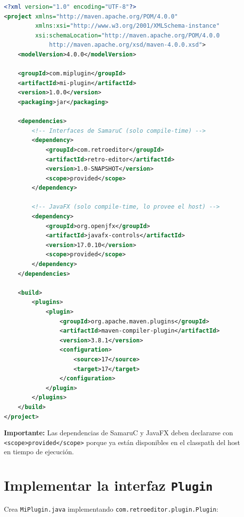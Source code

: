 \documentclass[../../main.tex]{subfiles}
\begin{document}
\begin{lstlisting}[language=xml, caption=Configuración Maven básica]
<?xml version="1.0" encoding="UTF-8"?>
<project xmlns="http://maven.apache.org/POM/4.0.0"
         xmlns:xsi="http://www.w3.org/2001/XMLSchema-instance"
         xsi:schemaLocation="http://maven.apache.org/POM/4.0.0
             http://maven.apache.org/xsd/maven-4.0.0.xsd">
    <modelVersion>4.0.0</modelVersion>

    <groupId>com.miplugin</groupId>
    <artifactId>mi-plugin</artifactId>
    <version>1.0.0</version>
    <packaging>jar</packaging>

    <dependencies>
        <!-- Interfaces de SamaruC (solo compile-time) -->
        <dependency>
            <groupId>com.retroeditor</groupId>
            <artifactId>retro-editor</artifactId>
            <version>1.0-SNAPSHOT</version>
            <scope>provided</scope>
        </dependency>

        <!-- JavaFX (solo compile-time, lo provee el host) -->
        <dependency>
            <groupId>org.openjfx</groupId>
            <artifactId>javafx-controls</artifactId>
            <version>17.0.10</version>
            <scope>provided</scope>
        </dependency>
    </dependencies>

    <build>
        <plugins>
            <plugin>
                <groupId>org.apache.maven.plugins</groupId>
                <artifactId>maven-compiler-plugin</artifactId>
                <version>3.8.1</version>
                <configuration>
                    <source>17</source>
                    <target>17</target>
                </configuration>
            </plugin>
        </plugins>
    </build>
</project>
\end{lstlisting}

\textbf{Importante:} Las dependencias de SamaruC y JavaFX deben declararse con \texttt{<scope>provided</scope>} porque ya están disponibles en el classpath del host en tiempo de ejecución.

\section{Implementar la interfaz \texttt{Plugin}}

Crea \texttt{MiPlugin.java} implementando \texttt{com.retroeditor.plugin.Plugin}:
\end{document}
